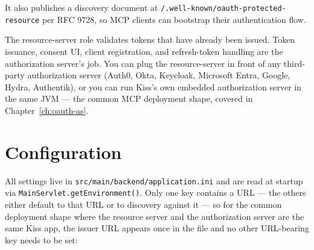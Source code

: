 It also publishes a discovery document at \texttt{/.well-known/oauth-protected-resource} per RFC 9728, so MCP clients can bootstrap their authentication flow.

\begin{notebox}
The resource-server role validates tokens that have already been issued.  Token issuance, consent UI, client registration, and refresh-token handling are the authorization server's job.  You can plug the resource-server in front of any third-party authorization server (Auth0, Okta, Keycloak, Microsoft Entra, Google, Hydra, Authentik), or you can run Kiss's own embedded authorization server in the same JVM --- the common MCP deployment shape, covered in Chapter~\ref{ch:oauth-as}.
\end{notebox}

\section{Configuration}
\label{sec:oauth-config}

All settings live in \texttt{src/main/back\-end/applic\-ation.ini} and are read at startup via \texttt{MainServlet.getEnvironment()}.  Only one key contains a URL --- the others either default to that URL or to discovery against it --- so for the common deployment shape where the resource server and the authorization server are the same Kiss app, the issuer URL appears once in the file and no other URL-bearing key needs to be set:

